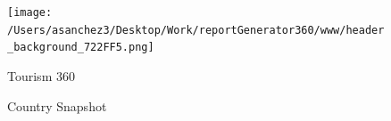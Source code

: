 \documentclass{article}\usepackage[]{graphicx}\usepackage[]{color}
\begin{document}
%



\begin{figure}
  \vspace{-3ex} %
\end{figure}

\begin{figure}
  \vspace{-1ex} %
  \texttt{[image: /Users/asanchez3/Desktop/Work/reportGenerator360/www/header\_background\_722FF5.png]}
\end{figure}

\begin{figure}
\begin{minipage}[t]{0.99\textwidth} %
  \vspace*{-26.8cm}
  \begin{minipage}[t]{0.48\textwidth} %
    \vspace{-1ex}
    \begin{minipage}[t]{0.99\textwidth} %
      \hspace{5ex}\raggedright\Large{\color{white}Tourism 360}
    \end{minipage}
  
    \begin{minipage}[b]{0.99\textwidth} 
      \vspace{4ex}
    \end{minipage}
    
    \begin{minipage}[t]{0.99\textwidth} %
      \vspace{4ex}
      \hspace{5ex}\raggedright\large{\color{white}Country Snapshot}
    \end{minipage}  
  \end{minipage}
  \begin{minipage}[t]{0.56\textwidth} %
    \vspace{-4ex}
    \begin{minipage}[c]{0.30\textwidth}



\end{minipage}
\end{minipage}
\end{minipage}
\end{figure}
\end{document}
